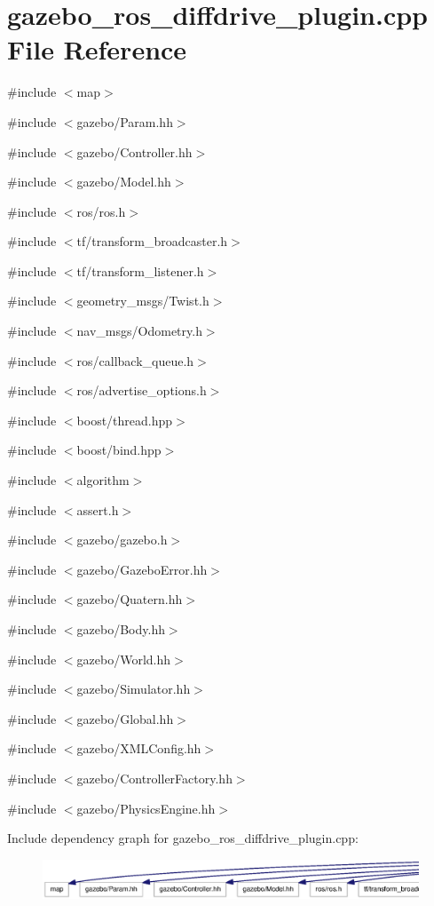 \section{gazebo\_\-ros\_\-diffdrive\_\-plugin.cpp File Reference}
\label{gazebo__ros__diffdrive__plugin_8cpp}
{\ttfamily \#include $<$map$>$}\par
{\ttfamily \#include $<$gazebo/Param.hh$>$}\par
{\ttfamily \#include $<$gazebo/Controller.hh$>$}\par
{\ttfamily \#include $<$gazebo/Model.hh$>$}\par
{\ttfamily \#include $<$ros/ros.h$>$}\par
{\ttfamily \#include $<$tf/transform\_\-broadcaster.h$>$}\par
{\ttfamily \#include $<$tf/transform\_\-listener.h$>$}\par
{\ttfamily \#include $<$geometry\_\-msgs/Twist.h$>$}\par
{\ttfamily \#include $<$nav\_\-msgs/Odometry.h$>$}\par
{\ttfamily \#include $<$ros/callback\_\-queue.h$>$}\par
{\ttfamily \#include $<$ros/advertise\_\-options.h$>$}\par
{\ttfamily \#include $<$boost/thread.hpp$>$}\par
{\ttfamily \#include $<$boost/bind.hpp$>$}\par
{\ttfamily \#include $<$algorithm$>$}\par
{\ttfamily \#include $<$assert.h$>$}\par
{\ttfamily \#include $<$gazebo/gazebo.h$>$}\par
{\ttfamily \#include $<$gazebo/GazeboError.hh$>$}\par
{\ttfamily \#include $<$gazebo/Quatern.hh$>$}\par
{\ttfamily \#include $<$gazebo/Body.hh$>$}\par
{\ttfamily \#include $<$gazebo/World.hh$>$}\par
{\ttfamily \#include $<$gazebo/Simulator.hh$>$}\par
{\ttfamily \#include $<$gazebo/Global.hh$>$}\par
{\ttfamily \#include $<$gazebo/XMLConfig.hh$>$}\par
{\ttfamily \#include $<$gazebo/ControllerFactory.hh$>$}\par
{\ttfamily \#include $<$gazebo/PhysicsEngine.hh$>$}\par
Include dependency graph for gazebo\_\-ros\_\-diffdrive\_\-plugin.cpp:
\nopagebreak
\begin{figure}[H]
\begin{center}
\leavevmode
\includegraphics[width=400pt]{gazebo__ros__diffdrive__plugin_8cpp__incl}
\end{center}
\end{figure}
